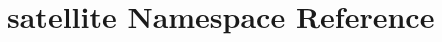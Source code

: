 \hypertarget{namespacesatellite}{\section{satellite Namespace Reference}
\label{namespacesatellite}
}
